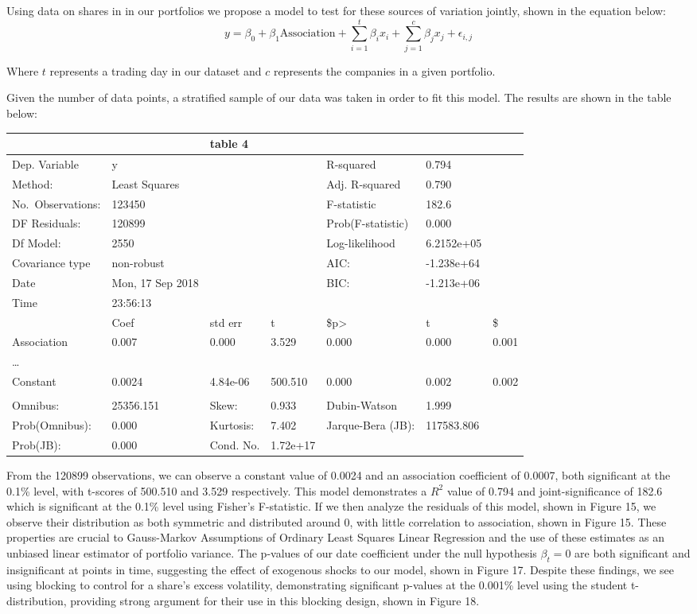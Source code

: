 \documentclass[11pt]{article}
\begin{document}
Using data on shares in in our portfolios we propose a model to test for
these sources of variation jointly, shown in the equation below:\\
\[ y = \beta_{0} + \beta_{1} \text{Association} +  \sum_{i=1}^{t} \beta_{i} x_{i}+ \sum_{j=1}^{c} \beta_{j} x_{j} + \epsilon_{i, j}  \]

Where \(t\) represents a trading day in our dataset and \(c\) represents
the companies in a given portfolio.

Given the number of data points, a stratified sample of our data was
taken in order to fit this model. The results are shown in the table
below:

\begin{longtable}[]{@{}lllllll@{}}
\toprule
& & table 4 & & & &\tabularnewline
\midrule
\endhead
Dep. Variable & y & & & R-squared & 0.794 &\tabularnewline
Method: & Least Squares & & & Adj. R-squared & 0.790 &\tabularnewline
No.~Observations: & 123450 & & & F-statistic & 182.6 &\tabularnewline
DF Residuals: & 120899 & & & Prob(F-statistic) & 0.000 &\tabularnewline
Df Model: & 2550 & & & Log-likelihood & 6.2152e+05 &\tabularnewline
Covariance type & non-robust & & & AIC: & -1.238e+64 &\tabularnewline
Date & Mon, 17 Sep 2018 & & & BIC: & -1.213e+06 &\tabularnewline
Time & 23:56:13 & & & & &\tabularnewline
& Coef & std err & t & \$p\textgreater{} & t & \$\tabularnewline
Association & 0.007 & 0.000 & 3.529 & 0.000 & 0.000 &
0.001\tabularnewline
\ldots{} & & & & & &\tabularnewline
Constant & 0.0024 & 4.84e-06 & 500.510 & 0.000 & 0.002 &
0.002\tabularnewline
& & & & & &\tabularnewline
Omnibus: & 25356.151 & Skew: & 0.933 & Dubin-Watson & 1.999
&\tabularnewline
Prob(Omnibus): & 0.000 & Kurtosis: & 7.402 & Jarque-Bera (JB): &
117583.806 &\tabularnewline
Prob(JB): & 0.000 & Cond. No. & 1.72e+17 & & &\tabularnewline
\bottomrule
\end{longtable}

From the 120899 observations, we can observe a constant value of 0.0024
and an association coefficient of 0.0007, both significant at the 0.1\%
level, with t-scores of 500.510 and 3.529 respectively. This model
demonstrates a \(R^2\) value of 0.794 and joint-significance of 182.6
which is significant at the 0.1\% level using Fisher's F-statistic. If
we then analyze the residuals of this model, shown in Figure 15, we
observe their distribution as both symmetric and distributed around 0,
with little correlation to association, shown in Figure 15. These
properties are crucial to Gauss-Markov Assumptions of Ordinary Least
Squares Linear Regression and the use of these estimates as an unbiased
linear estimator of portfolio variance. The p-values of our date
coefficient under the null hypothesis \(\beta_{t} = 0\) are both
significant and insignificant at points in time, suggesting the effect
of exogenous shocks to our model, shown in Figure 17. Despite these
findings, we see using blocking to control for a share's excess
volatility, demonstrating significant p-values at the 0.001\% level
using the student t-distribution, providing strong argument for their
use in this blocking design, shown in Figure 18.
\end{document}
